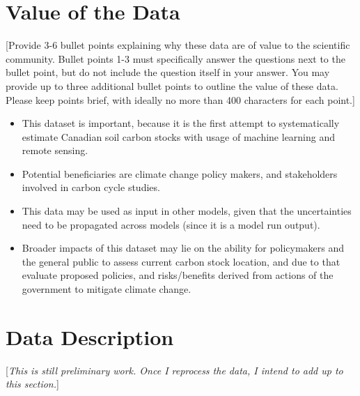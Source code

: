 \documentclass[times,final]{elsarticle.cls}
\begin{document}
\section*{Value of the Data}

[Provide 3-6 bullet points explaining why these data are of value to the scientific community. 
Bullet points 1-3 must specifically answer the questions next to the bullet point, 
but do not include the question itself in your answer. You may 
provide up to three additional bullet points to outline the value of these data. 
Please keep points brief, with ideally no more than 400 characters for each point.]

\begin{itemize}
\itemsep=0pt
\parsep=0pt
\item This dataset is important, because it is the first attempt to systematically estimate Canadian soil carbon stocks with usage of machine learning and remote sensing.
\item Potential beneficiaries are climate change policy makers, and stakeholders involved in carbon cycle studies.
\item This data may be used as input in other models, given that the uncertainties need to be propagated across models (since it is a model run output).
\item Broader impacts of this dataset may lie on the ability for policymakers and the general public to assess current carbon stock location, and due to that evaluate proposed policies, and risks/benefits derived from actions of the government to mitigate climate change. 
\end{itemize}

\section*{Data Description}
[\textit{This is still preliminary work. Once I reprocess the data, I intend to add up to this section.}]
\end{document}

